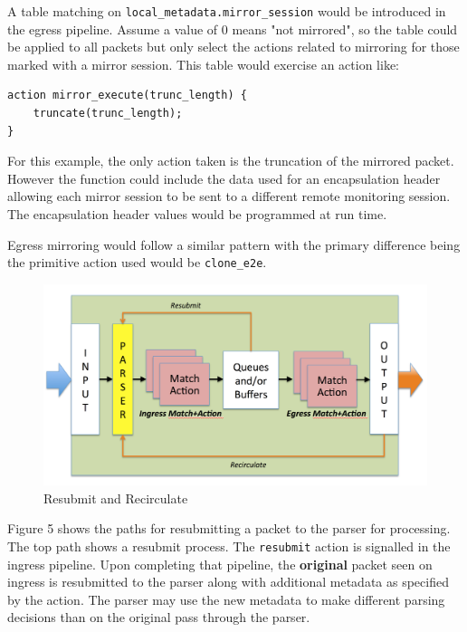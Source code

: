 \documentclass[12pt]{article}
\begin{document}
A table matching on \texttt{local_metadata.mirror_session} would be introduced 
in the egress pipeline. Assume a value of 0 means "not mirrored", so the table 
could be applied to all packets but only select the actions related to mirroring 
for those marked with a mirror session. This table would exercise an action 
like:

\begin{lstlisting}[keywords={},frame=single,escapechar=\@]
action mirror_execute(trunc_length) {
    truncate(trunc_length);
}
\end{lstlisting}


For this example, the only action taken is the truncation of the mirrored 
packet. However the function could include the data used for an encapsulation 
header allowing each mirror session to be sent to a different remote monitoring 
session. The encapsulation header values would be programmed at run time.

Egress mirroring would follow a similar pattern with the primary difference 
being the primitive action used would be \texttt{clone_e2e}.



\begin{figure}[h!]
    \centering
    \includegraphics[width=\textwidth]{figures/recirculate.png}
    \caption{Resubmit and Recirculate}
    \label{fig:recirc}
\end{figure}

Figure 5 shows the paths for resubmitting a packet to the parser for
processing.  The top path shows a resubmit process.  The
\texttt{resubmit} action is signalled in the ingress pipeline. Upon
completing that pipeline, the \textbf{original} packet seen on ingress
is resubmitted to the parser along with additional metadata as
specified by the action.  The parser may use the new metadata to make
different parsing decisions than on the original pass through the
parser.
\end{document}
